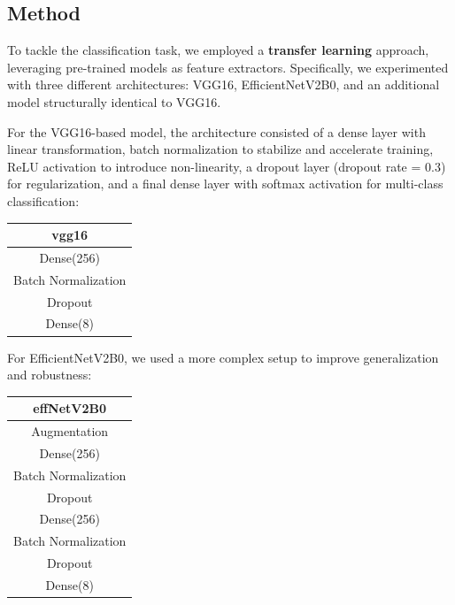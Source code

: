 \documentclass[11pt]{article}
\begin{document}
\begin{multicols*}{2}
        \section{Method}
        
        To tackle the classification task, we employed a \textbf{transfer learning} approach, leveraging pre-trained models as feature extractors. Specifically, we experimented with three different architectures: VGG16, EfficientNetV2B0, and an additional model structurally identical to VGG16.
        
        For the VGG16-based model, the architecture consisted of a dense layer with linear transformation, batch normalization to stabilize and accelerate training, ReLU activation to introduce non-linearity, a dropout layer (dropout rate = 0.3) for regularization, and a final dense layer with softmax activation for multi-class classification:

        \begin{center}
        \begin{tabular}{c}
        \hline
        vgg16\\
        \hline
        Dense(256)\\
        Batch Normalization\\
        Dropout\\
        Dense(8)\\
        \hline
        \end{tabular}
        \end{center}
        
        For EfficientNetV2B0, we used a more complex setup to improve generalization and robustness:

        \begin{center}
        \begin{tabular}{c}
        \hline
        effNetV2B0\\
        \hline
        Augmentation\\
        Dense(256)\\
        Batch Normalization\\
        Dropout\\
        Dense(256)\\
        Batch Normalization\\
        Dropout\\
        Dense(8)\\
        \hline
        \end{tabular}
        \end{center}
        

\end{multicols*}
\end{document}
